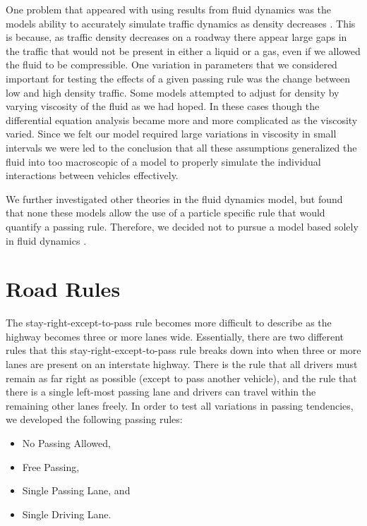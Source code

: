\documentclass{amsart}
\begin{document}
	One problem that appeared with using results from fluid dynamics was the models ability to accurately simulate traffic dynamics as density decreases \cite{stone2007introduction}. This is because, as traffic density decreases on a roadway there appear large gaps in the traffic that would not be present in either a liquid or a gas, even if we allowed the fluid to be compressible. One variation in parameters that we considered important for testing the effects of a given passing rule was the change between low and high density traffic. Some models attempted to adjust for density by varying viscosity of the fluid as we had hoped. In these cases though the differential equation analysis became more and more complicated as the viscosity varied. Since we felt our model required large variations in viscosity in small intervals we were led to the conclusion that all these assumptions generalized the fluid into too macroscopic of a model to properly simulate the individual interactions between vehicles effectively. 

	We further investigated other theories in the fluid dynamics model, but found that none these models allow the use of a particle specific rule that would quantify a passing rule. Therefore, we decided not to pursue a model based solely in fluid dynamics \cite{piccolireview}.
	

\section{\bfseries{Road Rules}}
	The stay-right-except-to-pass rule becomes more difficult to describe as the highway becomes three or more lanes wide. Essentially, there are two different rules that this stay-right-except-to-pass rule breaks down into when three or more lanes are present on an interstate highway. There is the rule that all drivers must remain as far right as possible (except to pass another vehicle), and the rule that there is a single left-most passing lane and drivers can travel within the remaining other lanes freely. In order to test all variations in passing tendencies, we developed the following passing rules:
		\begin{itemize}
			\item No Passing Allowed,
			\item Free Passing,
			\item Single Passing Lane, and
			\item Single Driving Lane.
		\end{itemize}
\end{document}
